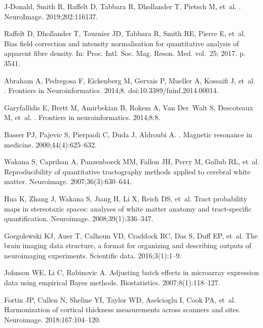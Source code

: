 \documentclass[10pt,letterpaper]{article}
\begin{document}
\begin{thebibliography}{100}
J-Donald, Smith R, Raffelt D, Tabbara R, Dhollander T, Pietsch M, et~al.
.
\newblock NeuroImage. 2019;202:116137.

Raffelt D, Dhollander T, Tournier JD, Tabbara R, Smith RE, Pierre E, et~al.
\newblock Bias field correction and intensity normalisation for quantitative
  analysis of apparent fibre density.
\newblock In: Proc. Intl. Soc. Mag. Reson. Med. vol.~25; 2017. p. 3541.

Abraham A, Pedregosa F, Eickenberg M, Gervais P, Mueller A, Kossaifi J, et~al.
.
\newblock Frontiers in Neuroinformatics. 2014;8.
\newblock doi:{10.3389/fninf.2014.00014}.

Garyfallidis E, Brett M, Amirbekian B, Rokem A, Van Der~Walt S, Descoteaux M,
  et~al.
.
\newblock Frontiers in neuroinformatics. 2014;8:8.

Basser PJ, Pajevic S, Pierpaoli C, Duda J, Aldroubi A.
.
\newblock Magnetic resonance in medicine. 2000;44(4):625--632.

Wakana S, Caprihan A, Panzenboeck MM, Fallon JH, Perry M, Gollub RL, et~al.
\newblock Reproducibility of quantitative tractography methods applied to
  cerebral white matter.
\newblock Neuroimage. 2007;36(3):630--644.

Hua K, Zhang J, Wakana S, Jiang H, Li X, Reich DS, et~al.
\newblock Tract probability maps in stereotaxic spaces: analyses of white
  matter anatomy and tract-specific quantification.
\newblock Neuroimage. 2008;39(1):336--347.

Gorgolewski KJ, Auer T, Calhoun VD, Craddock RC, Das S, Duff EP, et~al.
\newblock The brain imaging data structure, a format for organizing and
  describing outputs of neuroimaging experiments.
\newblock Scientific data. 2016;3(1):1--9.

Johnson WE, Li C, Rabinovic A.
\newblock Adjusting batch effects in microarray expression data using empirical
  Bayes methods.
\newblock Biostatistics. 2007;8(1):118--127.

Fortin JP, Cullen N, Sheline YI, Taylor WD, Aselcioglu I, Cook PA, et~al.
\newblock Harmonization of cortical thickness measurements across scanners and
  sites.
\newblock Neuroimage. 2018;167:104--120.


\end{thebibliography}
\end{document}
